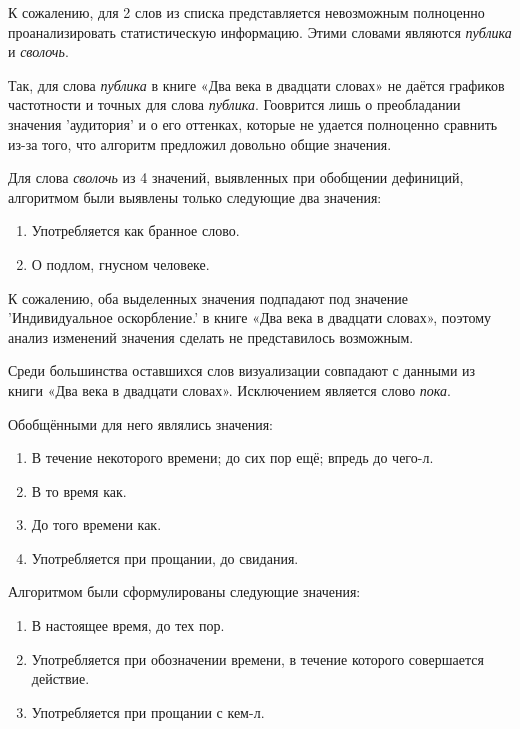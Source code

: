 \documentclass[LI,VKR]{HSEUniversity}
\begin{document}
К сожалению, для 2 слов из списка представляется невозможным полноценно проанализировать
статистическую информацию.
Этими словами являются \textit{публика} и \textit{сволочь}.

Так, для слова \textit{публика} в книге «Два века в двадцати словах» не даётся
графиков частотности и точных для слова \textit{публика}.
Гооврится лишь о преобладании значения ’аудитория’ и о его оттенках,
которые не удается полноценно сравнить из-за того, что алгоритм предложил довольно общие значения.

Для слова \textit{сволочь} из 4 значений, выявленных при обобщении дефиниций,
алгоритмом были выявлены только следующие два значения:
\begin{enumerate}
    \item Употребляется как бранное слово.
    \item О подлом, гнусном человеке.
\end{enumerate}

К сожалению, оба выделенных значения подпадают под значение ’Индивидуальное оскорбление.’
в книге «Два века в двадцати словах», поэтому анализ изменений значения
сделать не представилось возможным.

Среди большинства оставшихся слов визуализации совпадают с данными из книги «Два века в двадцати словах».
Исключением является слово \textit{пока}.

Обобщёнными для него являлись значения:
\begin{enumerate}
    \item В течение некоторого времени; до сих пор ещё; впредь до чего-л.
    \item В то время как.
    \item До того времени как.
    \item Употребляется при прощании, до свидания.
\end{enumerate}

Алгоритмом были сформулированы следующие значения:
\begin{enumerate}
    \item В настоящее время, до тех пор.
    \item Употребляется при обозначении времени, в течение которого совершается действие.
    \item Употребляется при прощании с кем-л.
\end{enumerate}
\end{document}

